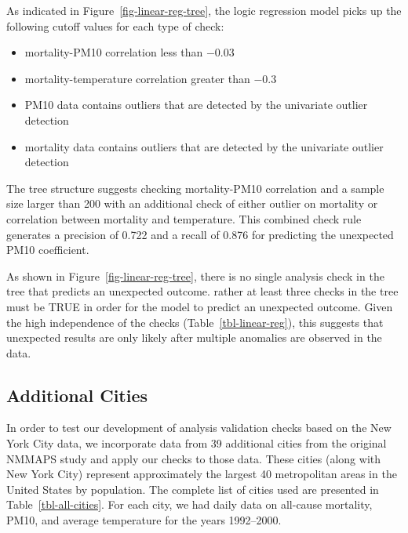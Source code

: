 \documentclass[
  12pt,
]{interact}
\providecommand{\tightlist}{%
  \setlength{\itemsep}{0pt}\setlength{\parskip}{0pt}}\usepackage{longtable,booktabs,array}
\begin{document}
As indicated in Figure~\ref{fig-linear-reg-tree}, the logic regression
model picks up the following cutoff values for each type of check:

\begin{itemize}
\tightlist
\item
  mortality-PM10 correlation less than \(-0.03\)
\item
  mortality-temperature correlation greater than \(-0.3\)
\item
  PM10 data contains outliers that are detected by the univariate
  outlier detection
\item
  mortality data contains outliers that are detected by the univariate
  outlier detection
\end{itemize}

The tree structure suggests checking mortality-PM10 correlation and a
sample size larger than 200 with an additional check of either outlier
on mortality or correlation between mortality and temperature. This
combined check rule generates a precision of 0.722 and a recall of 0.876
for predicting the unexpected PM10 coefficient.

As shown in Figure~\ref{fig-linear-reg-tree}, there is no single
analysis check in the tree that predicts an unexpected outcome. rather
at least three checks in the tree must be TRUE in order for the model to
predict an unexpected outcome. Given the high independence of the checks
(Table~\ref{tbl-linear-reg}), this suggests that unexpected results are
only likely after multiple anomalies are observed in the data.

\subsection{Additional Cities}\label{additional-cities}

In order to test our development of analysis validation checks based on
the New York City data, we incorporate data from 39 additional cities
from the original NMMAPS study and apply our checks to those data. These
cities (along with New York City) represent approximately the largest 40
metropolitan areas in the United States by population. The complete list
of cities used are presented in Table~\ref{tbl-all-cities}. For each
city, we had daily data on all-cause mortality, PM10, and average
temperature for the years 1992--2000.
\end{document}
